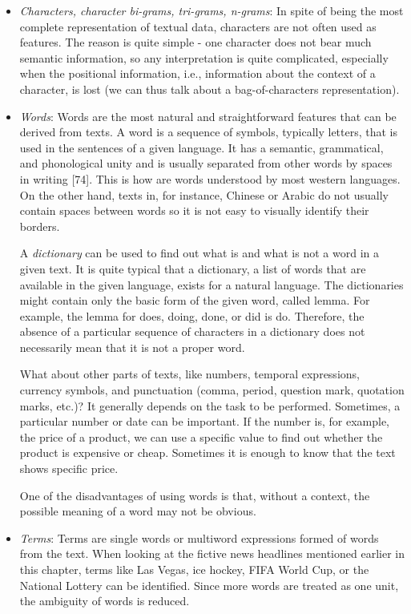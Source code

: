 \documentclass[11pt,openany,executivepaper]{book}
\begin{document}
\begin{itemize}
  \item \textit{Characters, character bi-grams, tri-grams, n-grams}: In spite of being the most complete representation of textual data, characters are not often used as features. The reason is quite simple - one character does not bear much semantic information, so any interpretation is quite complicated, especially when the positional information, i.e., information about the context of a character, is lost (we can thus talk about a bag-of-characters representation).
  \item \textit{Words}: Words are the most natural and straightforward features that can be derived from texts. A word is a sequence of symbols, typically letters, that is used in the sentences of a given language. It has a semantic, grammatical, and phonological unity and is usually separated from other words by spaces in writing [74]. This is how are words understood by most western languages. On the other hand, texts in, for instance, Chinese or Arabic do not usually contain spaces between words so it is not easy to visually identify their borders. 
  
  A \textit{dictionary} can be used to find out what is and what is not a word in a given text. It is quite typical that a dictionary, a list of words that are available in the given language, exists for a natural language. The dictionaries might contain only the basic form of the given word, called lemma. For example, the lemma for does, doing, done, or did is do. Therefore, the absence of a particular sequence of characters in a dictionary does not necessarily mean that it is not a proper word.
  \bigskip

  What about other parts of texts, like numbers, temporal expressions, currency symbols, and punctuation (comma, period, question mark, quotation marks, etc.)? It generally depends on the task to be performed. Sometimes, a particular number or date can be important. If the number is, for example, the price of a product, we can use a specific value to find out whether the product is expensive or cheap. Sometimes it is enough to know that the text shows specific price.
  \bigskip
  
  One of the disadvantages of using words is that, without a context, the possible meaning of a word may not be obvious.
  \bigskip
  
  \item \textit{Terms}: Terms are single words or multiword expressions formed of words from the text. When looking at the fictive news headlines mentioned earlier in this chapter, terms like Las Vegas, ice hockey, FIFA World Cup, or the National Lottery can be identified. Since more words are treated as one unit, the ambiguity of words is reduced.
  \bigskip


\end{itemize}
\end{document}
